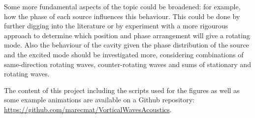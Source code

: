 \documentclass[%
 reprint,
 amsmath,amssymb,
 aps,
]{revtex4-2}
\begin{document}
Some more fundamental aspects of the topic could be broadened: for example, how the phase of each source influences this behaviour. This could be done by further digging into the literature or by experiment with a more rigourous approach to determine which position and phase arrangement will give a rotating mode. Also the behaviour of the cavity given the phase distribution of the source and the excited mode should be investigated more, considering combinations of same-direction rotating waves, counter-rotating waves and sums of stationary and rotating waves.

The content of this project including the scripts used for the figures as well as some example animations are available on a Github repository: \url{https://github.com/marecmat/VorticalWavesAcoustics}.


\end{document}
